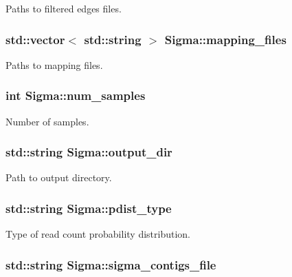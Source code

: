\label{classSigma_add16cab45b900fff34bedc48754facfc}
Paths to filtered edges files. \hypertarget{classSigma_a31a4de140e200e02a079d34d313ce618}{
\subsubsection[{mapping\_\-files}]{\setlength{\rightskip}{0pt plus 5cm}std::vector$<$ std::string $>$ {\bf Sigma::mapping\_\-files}}}
\label{classSigma_a31a4de140e200e02a079d34d313ce618}
Paths to mapping files. \hypertarget{classSigma_a898fdf105adde827c4fc00d63c056e87}{
\subsubsection[{num\_\-samples}]{\setlength{\rightskip}{0pt plus 5cm}int {\bf Sigma::num\_\-samples}}}
\label{classSigma_a898fdf105adde827c4fc00d63c056e87}
Number of samples. \hypertarget{classSigma_a5693c7923c23c51fb05eb6946a7adfc6}{
\subsubsection[{output\_\-dir}]{\setlength{\rightskip}{0pt plus 5cm}std::string {\bf Sigma::output\_\-dir}}}
\label{classSigma_a5693c7923c23c51fb05eb6946a7adfc6}
Path to output directory. \hypertarget{classSigma_a475c2fd313149f708f0907b981e57b1e}{
\subsubsection[{pdist\_\-type}]{\setlength{\rightskip}{0pt plus 5cm}std::string {\bf Sigma::pdist\_\-type}}}
\label{classSigma_a475c2fd313149f708f0907b981e57b1e}
Type of read count probability distribution. \hypertarget{classSigma_a57d2b73a5f595d5a91fab60d5663b0e0}{
\subsubsection[{sigma\_\-contigs\_\-file}]{\setlength{\rightskip}{0pt plus 5cm}std::string {\bf Sigma::sigma\_\-contigs\_\-file}}}

